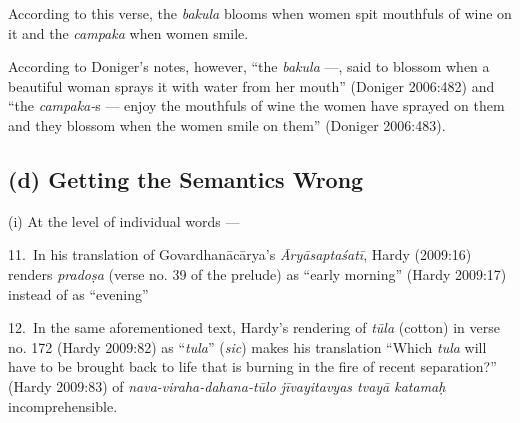 According to this verse, the \textsl{bakula} blooms when women spit mouthfuls of wine on it and the \textsl{campaka} when women smile. 

According to Doniger’s notes, however, “the \textsl{bakula} ---, said to blossom when a beautiful woman sprays it with water from her mouth” (Doniger 2006:482) and “the \textsl{campaka-}s --- enjoy the mouthfuls of wine the women have sprayed on them and they blossom when the women smile on them” (Doniger 2006:483). 

\subsection*{(d) Getting the Semantics Wrong}

(i) At the level of individual words --- 

11.~In his translation of Govardhanācārya’s \textsl{Āryāsaptaśatī}, Hardy (2009:16) renders \textsl{pradoṣa} (verse no. 39 of the prelude) as “early morning” (Hardy 2009:17) instead of as “evening”

12.~In the same aforementioned text, Hardy’s rendering of \textsl{tūla} (cotton) in verse no. 172 (Hardy 2009:82) as “\textsl{tula}” (\textsl{sic}) makes his translation “Which \textsl{tula} will have to be brought back to life that is burning in the fire of recent separation?” (Hardy 2009:83) of \textsl{nava-viraha-dahana-tūlo jīvayitavyas tvayā katamaḥ} incomprehensible. 

